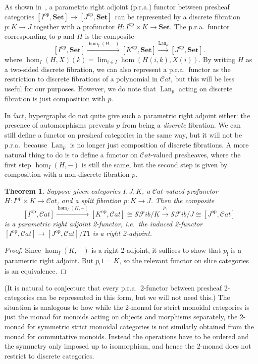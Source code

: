 \documentclass{article}
\newtheorem{thm}{Theorem}[section]
\theoremstyle{definition}
\theoremstyle{remark}
\def\Set{\mathbf{Set}}
\def\Cat{\ensuremath{\mathcal{C}\mathit{at}}}
\def\SFib{\mathcal{SF}\mathit{ib}}
\def\op{^{\mathrm{op}}}
\def\lan{\operatorname{Lan}}
\let\xto\xrightarrow
\begin{document}
As shown in~\cite{weber:fam-pra}, a parametric right adjoint (p.r.a.) functor between presheaf categories $[I\op,\Set]\to [J\op,\Set]$ can be represented by a discrete fibration $p:K\to J$ together with a profunctor $H:I\op\times K\to\Set$.
The p.r.a.\ functor corresponding to $p$ and $H$ is the composite
\[ [I\op,\Set] \xto{\hom_I(H,-)} [K\op,\Set] \xto{\lan_p} [J\op,\Set]. \]
where $\hom_I(H,X)(k) = \lim_{i\in I} \hom(H(i,k),X(i))$.
By writing $H$ as a two-sided discrete fibration, we can also represent a p.r.a.\ functor as the restriction to discrete fibrations of a polynomial in \Cat, but this will be less useful for our purposes.
However, we do note that $\lan_p$ acting on discrete fibration is just composition with $p$.

In fact, hypergraphs do not quite give such a parametric right adjoint either: the presence of automorphisms prevents $p$ from being a \emph{discrete} fibration.
We can still define a functor on presheaf categories in the same way, but it will not be p.r.a.\ because $\lan_p$ is no longer just composition of discrete fibrations.
A more natural thing to do is to define a functor on \Cat-valued presheaves, where the first step $\hom_I(H,-)$ is still the same, but the second step is given by composition with a non-discrete fibration $p$.

\begin{thm}
  Suppose given categories $I,J,K$, a \Cat-valued profunctor $H:I\op\times K\to \Cat$, and a split fibration $p:K\to J$.
  Then the composite
  \[ [I\op,\Cat] \xto{\hom_I(K,-)} [K\op,\Cat] \cong \SFib/K \xto{p_!} \SFib/J \cong [J\op,\Cat] \]
  is a parametric right adjoint 2-functor, i.e.\ the induced 2-functor $[I\op,\Cat] \to [J\op,\Cat]/T1$ is a right 2-adjoint.
\end{thm}
\begin{proof}
  Since $\hom_I(K,-)$ is a right 2-adjoint, it suffices to show that $p_!$ is a parametric right adjoint.
  But $p_!1 = K$, so the relevant functor on slice categories is an equivalence.
\end{proof}

(It is natural to conjecture that every p.r.a.\ 2-functor between presheaf 2-categories can be represented in this form, but we will not need this.)
The situation is analogous to how while the 2-monad for strict monoidal categories is just the monad for monoids acting on objects and morphisms separately, the 2-monad for symmetric strict monoidal categories is not similarly obtained from the monad for commutative monoids.
Instead the operations have to be ordered and the symmetry only imposed up to isomorphism, and hence the 2-monad does not restrict to discrete categories.
\end{document}
